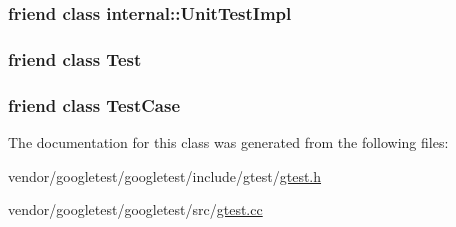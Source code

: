 \subsubsection[{\texorpdfstring{internal\+::\+Unit\+Test\+Impl}{internal::UnitTestImpl}}]{\setlength{\rightskip}{0pt plus 5cm}friend class {\bf internal\+::\+Unit\+Test\+Impl}\hspace{0.3cm}{\ttfamily [friend]}}\hypertarget{classtesting_1_1TestInfo_acc0a5e7573fd6ae7ad1878613bb86853}{}\label{classtesting_1_1TestInfo_acc0a5e7573fd6ae7ad1878613bb86853}
\subsubsection[{\texorpdfstring{Test}{Test}}]{\setlength{\rightskip}{0pt plus 5cm}friend class {\bf Test}\hspace{0.3cm}{\ttfamily [friend]}}\hypertarget{classtesting_1_1TestInfo_a5b78b1c2e1fa07ffed92da365593eaa4}{}\label{classtesting_1_1TestInfo_a5b78b1c2e1fa07ffed92da365593eaa4}
\subsubsection[{\texorpdfstring{Test\+Case}{TestCase}}]{\setlength{\rightskip}{0pt plus 5cm}friend class {\bf Test\+Case}\hspace{0.3cm}{\ttfamily [friend]}}\hypertarget{classtesting_1_1TestInfo_aff779e55b06adfa7c0088bd10253f0f0}{}\label{classtesting_1_1TestInfo_aff779e55b06adfa7c0088bd10253f0f0}


The documentation for this class was generated from the following files\+:\begin{DoxyCompactItemize}
\item 
vendor/googletest/googletest/include/gtest/\hyperlink{gtest_8h}{gtest.\+h}\item 
vendor/googletest/googletest/src/\hyperlink{gtest_8cc}{gtest.\+cc}\end{DoxyCompactItemize}
